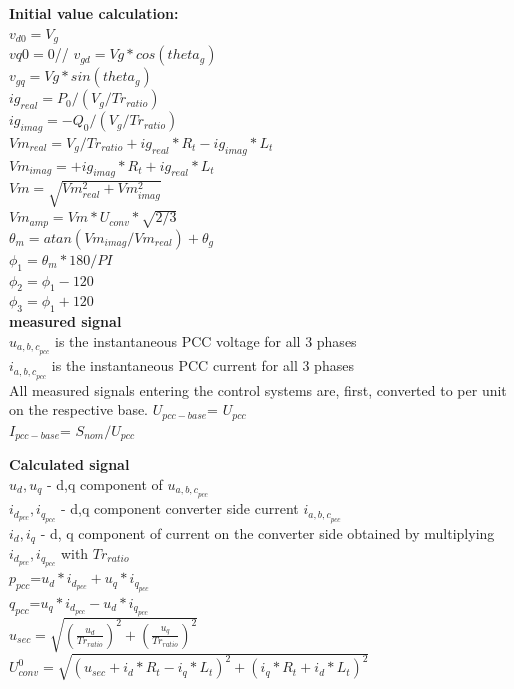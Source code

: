 \documentclass{report}
\begin{document}
\textbf{Initial value calculation:}\\
$v_{d0} = V_g$\\
$vq0 = 0$//
$v_{gd} = Vg*cos(theta_g)$\\
$v_{gq} = Vg*sin(theta_g)$\\
$ig_{real} = P_0 / (V_g/Tr_{ratio})$\\
$ig_{imag} = -Q_0 / (V_g/Tr_{ratio})$\\
$Vm_{real} = V_g/Tr_{ratio} + ig_{real}*R_t - ig_{imag} * L_t$\\
$Vm_{imag} = + ig_{imag}* R_t  + ig_{real}*L_t$\\
$Vm = \sqrt{Vm_{real}^2 + Vm_{imag}^2}$\\
$Vm_{amp} = Vm * U_{conv}*\sqrt{2/3}$\\
$\theta_m=atan(Vm_{imag}/Vm_{real}) + \theta_g$\\
$\phi_1 = \theta_m*180/PI$\\
$\phi_2 = \phi_1 - 120$\\
$\phi_3 = \phi_1 + 120$\\

\textbf{measured signal}\\ 
$u_{{a,b,c}_{pcc}}$ is the instantaneous PCC voltage for all 3 phases\\
$i_{{a,b,c}_{pcc}}$ is the instantaneous PCC current for all 3 phases\\
All measured signals entering the
control systems are, first, converted to per unit on the respective base. 
$U_{pcc-base}$= $U_{pcc}$\\
$I_{pcc-base}$= $S_{nom}/ U_{pcc}$


\textbf{Calculated signal}\\ 
$u_d, u_q$ - d,q component of $u_{{a,b,c}_{pcc}}$\\
$i_{d_{pcc}}, i_{q_{pcc}}$ - d,q component converter side current $i_{{a,b,c}_{pcc}}$ \\
$i_d,i_q$ - d, q component of current on the converter side obtained by multiplying $i_{d_{pcc}}, i_{q_{pcc}}$ with $Tr_{ratio}$\\
$p_{pcc}$=$u_d*i_{d_{pcc}} + u_q*i_{q_{pcc}}$\\
$q_{pcc}$=$u_q*i_{d_{pcc}} - u_d*i_{q_{pcc}}$\\
$u_{sec}=\sqrt{(\frac{u_d}{Tr_{ratio}})^2 + (\frac{u_q}{Tr_{ratio}})^2}$\\
$U_{conv}^0=\sqrt{(u_{sec} + i_d*R_t - i_q*L_t)^2 + (i_q*R_t +i_d*L_t)^2}$\\
\end{document}
